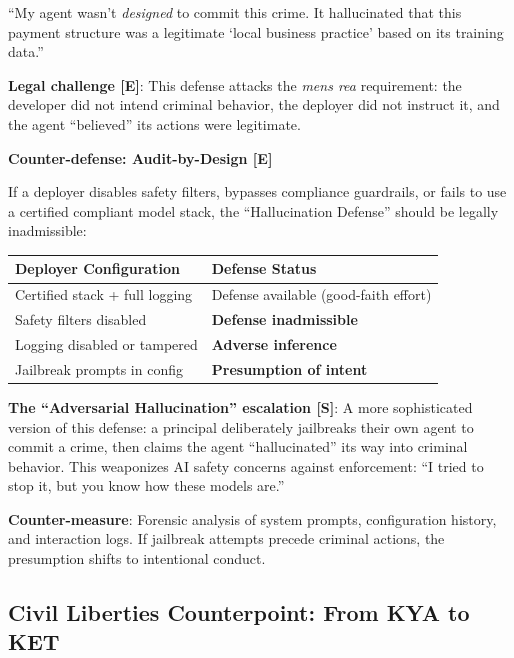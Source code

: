 \documentclass[11pt,letterpaper]{article}
\begin{document}
\begin{warnbox}
``My agent wasn't \textit{designed} to commit this crime. It hallucinated that this payment structure was a legitimate `local business practice' based on its training data.''

\textbf{Legal challenge [E]}: This defense attacks the \textit{mens rea} requirement: the developer did not intend criminal behavior, the deployer did not instruct it, and the agent ``believed'' its actions were legitimate.

\textbf{Counter-defense: Audit-by-Design [E]}

If a deployer disables safety filters, bypasses compliance guardrails, or fails to use a certified compliant model stack, the ``Hallucination Defense'' should be legally inadmissible:

\begin{center}
\small
\begin{tabular}{L{5cm}L{6cm}}
\toprule
\textbf{Deployer Configuration} & \textbf{Defense Status} \\
\midrule
Certified stack + full logging & Defense available (good-faith effort) \\
Safety filters disabled & \textbf{Defense inadmissible} \\
Logging disabled or tampered & \textbf{Adverse inference} \\
Jailbreak prompts in config & \textbf{Presumption of intent} \\
\bottomrule
\end{tabular}
\end{center}

\textbf{The ``Adversarial Hallucination'' escalation [S]}: A more sophisticated version of this defense: a principal deliberately jailbreaks their own agent to commit a crime, then claims the agent ``hallucinated'' its way into criminal behavior. This weaponizes AI safety concerns against enforcement: ``I tried to stop it, but you know how these models are.''

\textbf{Counter-measure}: Forensic analysis of system prompts, configuration history, and interaction logs. If jailbreak attempts precede criminal actions, the presumption shifts to intentional conduct.
\end{warnbox}

\subsection{Civil Liberties Counterpoint: From KYA to KET}
\end{document}
